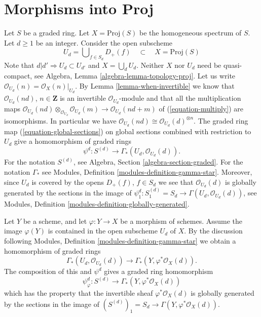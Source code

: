 \documentclass{stacks-project}
\theoremstyle{plain}
\theoremstyle{definition}
\theoremstyle{remark}
\numberwithin{equation}{subsection}
\begin{document}
\section{Morphisms into Proj}
\label{section-morphisms-proj}

\noindent
Let $S$ be a graded ring.
Let $X = \text{Proj}(S)$ be the homogeneous spectrum of $S$.
Let $d \geq 1$ be an integer.
Consider the open subscheme
\begin{equation}
\label{equation-Ud}
U_d = \bigcup\nolimits_{f  \in S_d} D_{+}(f)
\quad\subset\quad
X = \text{Proj}(S)
\end{equation}
Note that $d | d' \Rightarrow U_d \subset U_{d'}$ and
$X = \bigcup_d U_d$. Neither $X$ nor $U_d$ need
be quasi-compact, see Algebra, Lemma \ref{algebra-lemma-topology-proj}.
Let us write $\mathcal{O}_{U_d}(n) = \mathcal{O}_X(n)|_{U_d}$.
By Lemma \ref{lemma-when-invertible}
we know that $\mathcal{O}_{U_d}(nd)$, $n \in \mathbf{Z}$
is an invertible $\mathcal{O}_{U_d}$-module and
that all the multiplication maps
$\mathcal{O}_{U_d}(nd) \otimes_{\mathcal{O}_{U_d}} \mathcal{O}_{U_d}(m)
\to \mathcal{O}_{U_d}(nd + m)$ of
(\ref{equation-multiply}) are isomorphisms. In particular we have
$\mathcal{O}_{U_d}(nd) \cong \mathcal{O}_{U_d}(d)^{\otimes n}$.
The graded ring map (\ref{equation-global-sections}) on global sections
combined with restriction to $U_d$ give a homomorphism of graded rings
\begin{equation}
\label{equation-psi-d}
\psi^d : S^{(d)} \longrightarrow \Gamma_*(U_d, \mathcal{O}_{U_d}(d)).
\end{equation}
For the notation $S^{(d)}$, see Algebra, Section \ref{algebra-section-graded}.
For the notation $\Gamma_*$ see
Modules, Definition \ref{modules-definition-gamma-star}.
Moreover, since $U_d$ is covered by the opens $D_{+}(f)$, $f \in S_d$
we see that $\mathcal{O}_{U_d}(d)$ is globally generated
by the sections in the image of
$\psi^d_1 : S^{(d)}_1 = S_d \to \Gamma(U_d, \mathcal{O}_{U_d}(d))$, see
Modules, Definition \ref{modules-definition-globally-generated}.

\medskip\noindent
Let $Y$ be a scheme, and let $\varphi : Y \to X$ be a morphism of schemes.
Assume the image $\varphi(Y)$ is contained in the open subscheme
$U_d$ of $X$.
By the discussion following
Modules, Definition \ref{modules-definition-gamma-star}
we obtain a homomorphism of graded rings
$$
\Gamma_*(U_d, \mathcal{O}_{U_d}(d))
\longrightarrow
\Gamma_*(Y, \varphi^*\mathcal{O}_X(d)).
$$
The composition of this and $\psi^d$ gives a graded ring
homomorphism
\begin{equation}
\label{equation-psi-phi-d}
\psi_\varphi^d :
S^{(d)}
\longrightarrow
\Gamma_*(Y, \varphi^*\mathcal{O}_X(d))
\end{equation}
which has the property that the invertible sheaf
$\varphi^*\mathcal{O}_X(d)$ is globally generated
by the sections in the image of
$(S^{(d)})_1 = S_d \to \Gamma(Y, \varphi^*\mathcal{O}_X(d))$.
\end{document}
